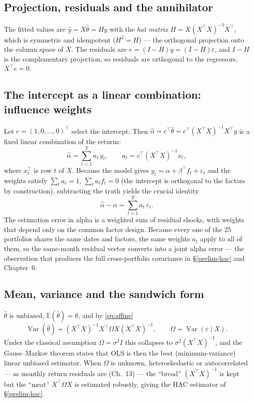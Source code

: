 \subsection{Projection, residuals and the annihilator}

The fitted values are $\hat y=X\hat\theta=Hy$ with the \emph{hat matrix}
$H=X(X^{\top}X)^{-1}X^{\top}$, which is symmetric and idempotent
($H^2=H$) --- the orthogonal projection onto the column space of $X$. The
residuals are $e=(I-H)y=(I-H)\varepsilon$, and $I-H$ is the complementary
projection, so residuals are orthogonal to the regressors, $X^{\top}e=0$.

\subsection{The intercept as a linear combination: influence weights}

Let $c=(1,0,\dots,0)^{\top}$ select the intercept. Then
$\hat\alpha=c^{\top}\hat\theta=c^{\top}(X^{\top}X)^{-1}X^{\top}y$ is a fixed
linear combination of the returns:
\begin{equation}\label{eq:influence}
\hat\alpha=\sum_{t=1}^{T}a_t\,y_t,\qquad
a_t=c^{\top}(X^{\top}X)^{-1}x_t,
\end{equation}
where $x_t^{\top}$ is row $t$ of $X$. Because the model gives
$y_t=\alpha+\beta^{\top}f_t+\varepsilon_t$ and the weights satisfy
$\sum_t a_t=1$, $\sum_t a_t f_t=0$ (the intercept is orthogonal to the
factors by construction), subtracting the truth yields the crucial
identity
\begin{equation}\label{eq:alpha-error}
\hat\alpha-\alpha=\sum_{t=1}^{T}a_t\,\varepsilon_t .
\end{equation}
The estimation error in alpha is a weighted sum of residual shocks, with
weights that depend only on the common factor design. Because every one of
the 25 portfolios shares the same dates and factors, the same weights
$a_t$ apply to all of them, so the same-month residual vector converts
into a joint alpha error --- the observation that produces the full
cross-portfolio covariance in \S\ref{prelim-hac} and Chapter~6.

\subsection{Mean, variance and the sandwich form}

$\hat\theta$ is unbiased, $\mathbb{E}(\hat\theta)=\theta$, and by
\eqref{eq:affine}
\begin{equation}\label{eq:sandwich}
\operatorname{Var}(\hat\theta)=(X^{\top}X)^{-1}X^{\top}\Omega X(X^{\top}X)^{-1},
\qquad \Omega=\operatorname{Var}(\varepsilon\mid X).
\end{equation}
Under the classical assumption $\Omega=\sigma^2 I$ this collapses to
$\sigma^2(X^{\top}X)^{-1}$, and the Gauss--Markov theorem states that OLS is
then the best (minimum-variance) linear unbiased estimator. When $\Omega$
is unknown, heteroskedastic or autocorrelated --- as monthly return
residuals are (Ch.~13) --- the ``bread'' $(X^{\top}X)^{-1}$ is kept but the
``meat'' $X^{\top}\Omega X$ is estimated robustly, giving the HAC estimator
of \S\ref{prelim-hac}.

